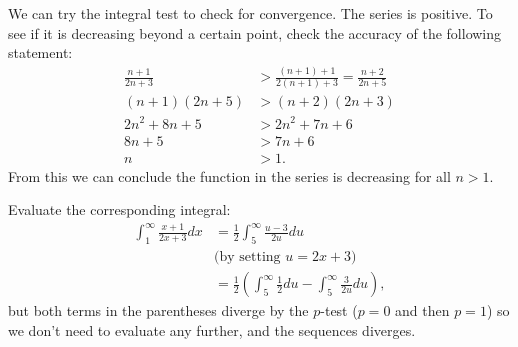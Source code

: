 \documentclass[11pt,letterpaper]{article}
\begin{document}
\begin{enumerate}
\begin{enumerate}
We can try the integral test to check for convergence.  The series is positive.  To see if it is decreasing beyond a certain point, check the accuracy of the following statement:
\begin{align*}
\frac{n+1}{2n+3} &> \frac{(n+1)+1}{2(n+1)+3}=\frac{n+2}{2n+5} \\
(n+1)(2n+5) &> (n+2)(2n+3) \\
2n^2+8n+5 &> 2n^2+7n+6 \\
8n+5 &> 7n+6 \\
n&>1.
\end{align*}
From this we can conclude the function in the series is decreasing for all $n>1$.  

Evaluate the corresponding integral:
\begin{align*}
\int_1^{\infty}\frac{x+1}{2x+3}dx &=\frac{1}{2}\int_5^{\infty}\frac{u-3}{2u}du \\
& \text{(by setting $u=2x+3$)} \\
&= \frac{1}{2}\left(\int_5^{\infty}\frac{1}{2}du-\int_5^{\infty}\frac{3}{2u}du\right),
\end{align*}
but both terms in the parentheses diverge by the $p$-test ($p=0$ and then $p=1$) so we don't need to evaluate any further, and the sequences diverges.

\end{enumerate}

\end{enumerate}
\end{document}
